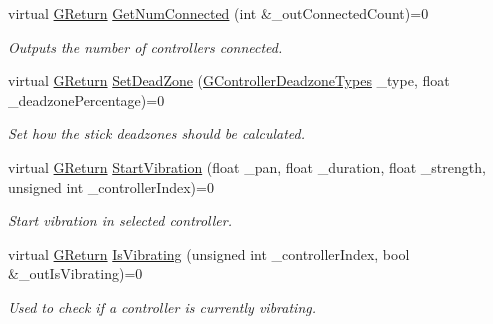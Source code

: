 \begin{DoxyCompactItemize}
virtual \mbox{\hyperlink{namespace_g_w_a67a839e3df7ea8a5c5686613a7a3de21}{G\+Return}} \mbox{\hyperlink{class_g_w_1_1_s_y_s_t_e_m_1_1_g_controller_ae7905c691a0304c11c70d337d708e5b8}{Get\+Num\+Connected}} (int \&\+\_\+out\+Connected\+Count)=0
\begin{DoxyCompactList}\small\item\em Outputs the number of controllers connected. \end{DoxyCompactList}\item 
\mbox{\label{class_g_w_1_1_s_y_s_t_e_m_1_1_g_controller_a5ef56fa1c46f57feebf45e8c1cb3055d}} 
virtual \mbox{\hyperlink{namespace_g_w_a67a839e3df7ea8a5c5686613a7a3de21}{G\+Return}} \mbox{\hyperlink{class_g_w_1_1_s_y_s_t_e_m_1_1_g_controller_a5ef56fa1c46f57feebf45e8c1cb3055d}{Set\+Dead\+Zone}} (\mbox{\hyperlink{namespace_g_w_1_1_s_y_s_t_e_m_a31011e5fdef70ea7c975794fe99319d4}{G\+Controller\+Deadzone\+Types}} \+\_\+type, float \+\_\+deadzone\+Percentage)=0
\begin{DoxyCompactList}\small\item\em Set how the stick deadzones should be calculated. \end{DoxyCompactList}\item 
\mbox{\label{class_g_w_1_1_s_y_s_t_e_m_1_1_g_controller_a4d33790f8116be094858618617c65b01}} 
virtual \mbox{\hyperlink{namespace_g_w_a67a839e3df7ea8a5c5686613a7a3de21}{G\+Return}} \mbox{\hyperlink{class_g_w_1_1_s_y_s_t_e_m_1_1_g_controller_a4d33790f8116be094858618617c65b01}{Start\+Vibration}} (float \+\_\+pan, float \+\_\+duration, float \+\_\+strength, unsigned int \+\_\+controller\+Index)=0
\begin{DoxyCompactList}\small\item\em Start vibration in selected controller. \end{DoxyCompactList}\item 
\mbox{\label{class_g_w_1_1_s_y_s_t_e_m_1_1_g_controller_aee5451a8bed11fa01f9a51e5506719e8}} 
virtual \mbox{\hyperlink{namespace_g_w_a67a839e3df7ea8a5c5686613a7a3de21}{G\+Return}} \mbox{\hyperlink{class_g_w_1_1_s_y_s_t_e_m_1_1_g_controller_aee5451a8bed11fa01f9a51e5506719e8}{Is\+Vibrating}} (unsigned int \+\_\+controller\+Index, bool \&\+\_\+out\+Is\+Vibrating)=0
\begin{DoxyCompactList}\small\item\em Used to check if a controller is currently vibrating. \end{DoxyCompactList}\item 

\end{DoxyCompactItemize}
